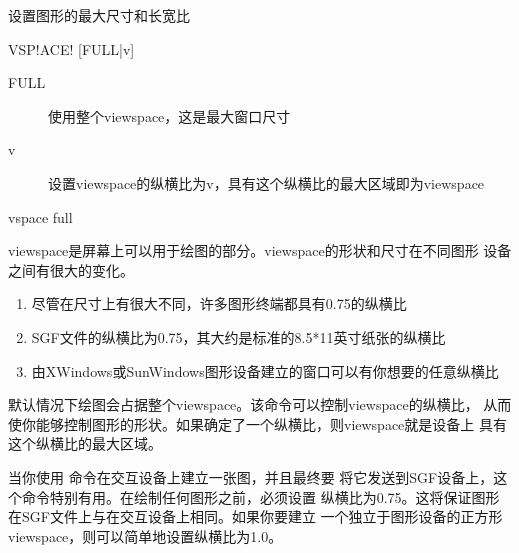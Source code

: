 \label{cmd:vspace}

设置图形的最大尺寸和长宽比

\begin{SACSTX}
VSP!ACE! [FULL|v]
\end{SACSTX}

\begin{description}
\item [FULL] 使用整个viewspace，这是最大窗口尺寸
\item [v] 设置viewspace的纵横比为v，具有这个纵横比的最大区域即为viewspace
\end{description}

\begin{SACDFT}
vspace full
\end{SACDFT}

viewspace是屏幕上可以用于绘图的部分。viewspace的形状和尺寸在不同图形
设备之间有很大的变化。
\begin{enumerate}
\item 尽管在尺寸上有很大不同，许多图形终端都具有0.75的纵横比
\item SGF文件的纵横比为0.75，其大约是标准的8.5*11英寸纸张的纵横比
\item 由XWindows或SunWindows图形设备建立的窗口可以有你想要的任意纵横比
\end{enumerate}

默认情况下绘图会占据整个viewspace。该命令可以控制viewspace的纵横比，
从而使你能够控制图形的形状。如果确定了一个纵横比，则viewspace就是设备上
具有这个纵横比的最大区域。

当你使用  命令在交互设备上建立一张图，并且最终要
将它发送到SGF设备上，这个命令特别有用。在绘制任何图形之前，必须设置
纵横比为0.75。这将保证图形在SGF文件上与在交互设备上相同。如果你要建立
一个独立于图形设备的正方形viewspace，则可以简单地设置纵横比为1.0。
